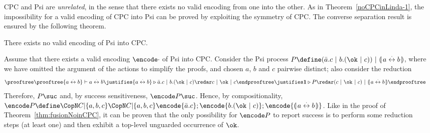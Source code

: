 \documentclass{LMCS}
\begin{document}
CPC and Psi are {\em unrelated}, in the sense that there exists no valid
encoding from one into the other. As in Theorem~\ref{noCPCinLinda-1}, 
the impossibility for a valid
encoding of CPC into Psi can be proved by exploiting 
the symmetry of CPC.
The converse separation result is ensured by the following theorem.

\begin{thm}
\label{thm:psiNoinCPC}
There exists no valid encoding of Psi into CPC.
\end{thm}
\proof
Assume that there exists a valid encoding $\encode\cdot$
of Psi into CPC. Consider the Psi process 
$P \define (\bar a.c \ |\ b.(\ok\ |\ c))\ | \ \assert{a \cheq b}$,
where we have omitted the argument of the actions to simplify the proofs,
and chosen $a$, $b$ and $c$ pairwise distinct; also consider the reduction
$$
\prooftree
	\prooftree \{a \cheq b\} \vdash a \cheq b
	\justifies \{a \cheq b\} \triangleright \bar a.c \ |\ b.(\ok\ |\ c) \redar c \ |\ \ok\ |\ c
	\endprooftree
\justifies \one \triangleright P \redar (c\ |\ \ok\ |\ c)\ | \ \assert{a \cheq b}
\endprooftree
$$
Therefore, $P \suc$ and, by success sensitiveness, $\encode P \suc$. 
Hence, by compositionality, $\encode P \define \CopN C {|} {\{a,b,c\}} 
{\CopN C | {\{a,b,c\}} {\encode{\bar a.c}; \encode{b.(\ok\ |\ c)}}; \encode{\assert{a \cheq b}}}$.
Like in the proof of Theorem~\ref{thm:fusionNoinCPC}, it can be proven that the only possibility 
for $\encode P$ to report success is to perform some reduction steps (at least one) and then exhibit
a top-level unguarded occurrence of $\ok$.
\end{document}

